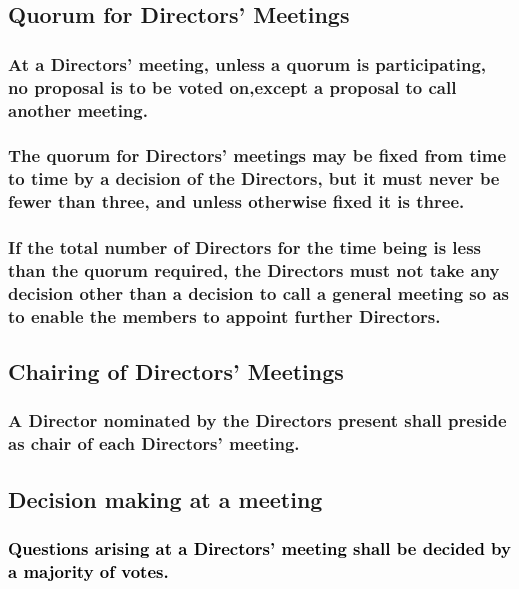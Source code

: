 \documentclass[12pt]{article}
\def\fakecolour{black}
\begin{document}
\subsection{Quorum for Directors' Meetings}
\subsubsection[Quorum at Directors' Meetings is Fundamental]{At a Directors' meeting, unless a quorum is participating, no proposal is to be voted on,except a proposal to call another meeting.}
\subsubsection[Quorum at Directors' Meetings May Be Fixed]{The quorum for Directors' meetings may be fixed from time to time by a decision of the Directors, but it must never be fewer than three, and unless otherwise fixed it is three.}
\subsubsection[Calling a General Meeting in Absence of Directors' Quorum]{If the total number of Directors for the time being is less than the quorum required, the Directors must not take any decision other than a decision to call a general meeting so as to enable the members to appoint further Directors.}

\subsection{Chairing of Directors' Meetings}
\subsubsection[Director to Chair a Given Directors' Meeting]{A Director nominated by the Directors present shall preside as chair of each Directors' meeting.}

\subsection{Decision making at a meeting}
  \subsubsection[Majority Voting at Directors' Meetings]{\textcolor{\fakecolour}{Questions arising at a Directors' meeting shall be decided by a majority of votes.}}
\end{document}
